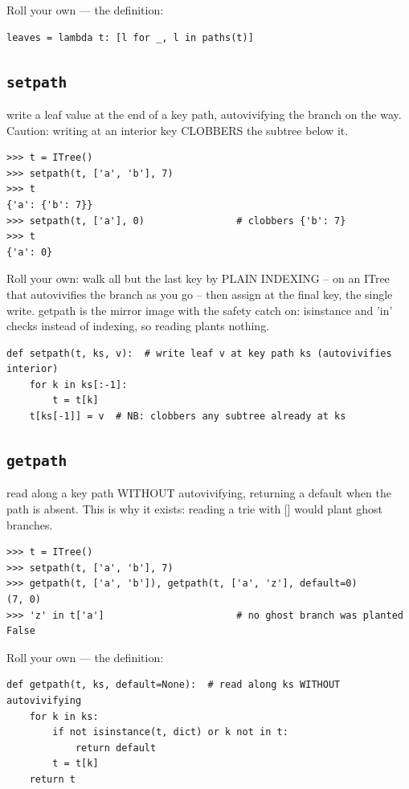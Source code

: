 \documentclass[10pt,letterpaper]{book}
\begin{document}
Roll your own --- the definition:

\begin{lstlisting}[style=ex]
leaves = lambda t: [l for _, l in paths(t)]
\end{lstlisting}

\subsection{\texttt{setpath}}\label{def:setpath}
write a leaf value at the end of a key path, autovivifying the branch on the way. Caution: writing at an interior key CLOBBERS the subtree below it.
\begin{lstlisting}[style=ex]
>>> t = ITree()
>>> setpath(t, ['a', 'b'], 7)
>>> t
{'a': {'b': 7}}
>>> setpath(t, ['a'], 0)                # clobbers {'b': 7}
>>> t
{'a': 0}
\end{lstlisting}

Roll your own: walk all but the last key by PLAIN INDEXING -- on an ITree that autovivifies the branch as you go -- then assign at the final key, the single write. getpath is the mirror image with the safety catch on: isinstance and 'in' checks instead of indexing, so reading plants nothing.

\begin{lstlisting}[style=ex]
def setpath(t, ks, v):  # write leaf v at key path ks (autovivifies interior)
    for k in ks[:-1]:
        t = t[k]
    t[ks[-1]] = v  # NB: clobbers any subtree already at ks
\end{lstlisting}
\subsection{\texttt{getpath}}\label{def:getpath}
read along a key path WITHOUT autovivifying, returning a default when the path is absent. This is why it exists: reading a trie with [] would plant ghost branches.
\begin{lstlisting}[style=ex]
>>> t = ITree()
>>> setpath(t, ['a', 'b'], 7)
>>> getpath(t, ['a', 'b']), getpath(t, ['a', 'z'], default=0)
(7, 0)
>>> 'z' in t['a']                       # no ghost branch was planted
False
\end{lstlisting}

Roll your own --- the definition:

\begin{lstlisting}[style=ex]
def getpath(t, ks, default=None):  # read along ks WITHOUT autovivifying
    for k in ks:
        if not isinstance(t, dict) or k not in t:
            return default
        t = t[k]
    return t
\end{lstlisting}
\end{document}
